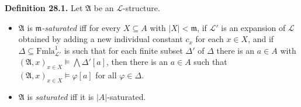 \textbf{Definition 28.1.}
Let $\mathfrak{A}$ be an $\mathcal{L}$-structure.
\begin{itemize}
\item $\mathfrak{A}$ is \textit{$\mathfrak{m}$-saturated} iff for every $X \subseteq A$ with $|X| < \mathfrak{m}$, if $\mathcal{L}'$ is an expansion of $\mathcal{L}$ obtained by adding a new individual constant $c_x$ for each $x \in X$, and if $\Delta \subseteq \mathrm{Fmla}_{\mathcal{L}'}^1$ is such that for each finite subset $\Delta'$ of $\Delta$ there is an $a \in A$ with $(\mathfrak{A}, x)_{x \in X} \models \bigwedge \Delta'[a]$, then there is an $a \in A$ such that $(\mathfrak{A}, x)_{x \in X} \models \varphi[a]$ for all $\varphi \in \Delta$.
\item $\mathfrak{A}$ is \textit{saturated} iff it is $|A|$-saturated.
\end{itemize}
